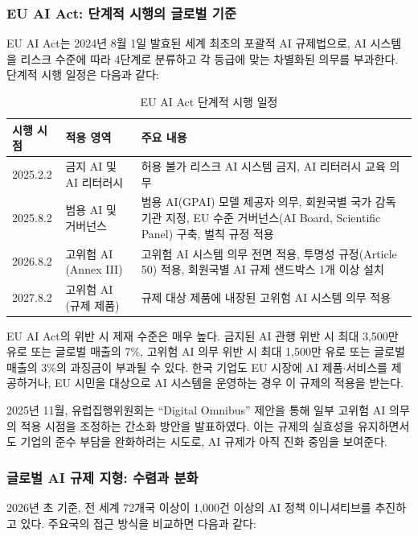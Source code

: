 \subsubsection*{EU AI Act: 단계적 시행의 글로벌 기준}

EU AI Act는 2024년 8월 1일 발효된 세계 최초의 포괄적 AI 규제법으로, AI 시스템을 리스크 수준에 따라 4단계로 분류하고 각 등급에 맞는 차별화된 의무를 부과한다.\cite{eu2024aiact} 단계적 시행 일정은 다음과 같다:

\begin{table}[htbp]
\centering
\caption{EU AI Act 단계적 시행 일정}
\label{tab:eu_ai_act_timeline}
\begin{tabularx}{\textwidth}{|l|l|X|}
\hline
\textbf{시행 시점} & \textbf{적용 영역} & \textbf{주요 내용} \\ \hline
2025.2.2 & 금지 AI 및 AI 리터러시 & 허용 불가 리스크 AI 시스템 금지, AI 리터러시 교육 의무 \\ \hline
2025.8.2 & 범용 AI 및 거버넌스 & 범용 AI(GPAI) 모델 제공자 의무, 회원국별 국가 감독기관 지정, EU 수준 거버넌스(AI Board, Scientific Panel) 구축, 벌칙 규정 적용 \\ \hline
2026.8.2 & 고위험 AI (Annex III) & 고위험 AI 시스템 의무 전면 적용, 투명성 규정(Article 50) 적용, 회원국별 AI 규제 샌드박스 1개 이상 설치 \\ \hline
2027.8.2 & 고위험 AI (규제 제품) & 규제 대상 제품에 내장된 고위험 AI 시스템 의무 적용 \\ \hline
\end{tabularx}
\end{table}

EU AI Act의 위반 시 제재 수준은 매우 높다. 금지된 AI 관행 위반 시 최대 3,500만 유로 또는 글로벌 매출의 7\%, 고위험 AI 의무 위반 시 최대 1,500만 유로 또는 글로벌 매출의 3\%의 과징금이 부과될 수 있다. 한국 기업도 EU 시장에 AI 제품$\cdot$서비스를 제공하거나, EU 시민을 대상으로 AI 시스템을 운영하는 경우 이 규제의 적용을 받는다.

2025년 11월, 유럽집행위원회는 ``Digital Omnibus'' 제안을 통해 일부 고위험 AI 의무의 적용 시점을 조정하는 간소화 방안을 발표하였다. 이는 규제의 실효성을 유지하면서도 기업의 준수 부담을 완화하려는 시도로, AI 규제가 아직 진화 중임을 보여준다.

\subsubsection*{글로벌 AI 규제 지형: 수렴과 분화}

2026년 초 기준, 전 세계 72개국 이상이 1,000건 이상의 AI 정책 이니셔티브를 추진하고 있다. 주요국의 접근 방식을 비교하면 다음과 같다:

